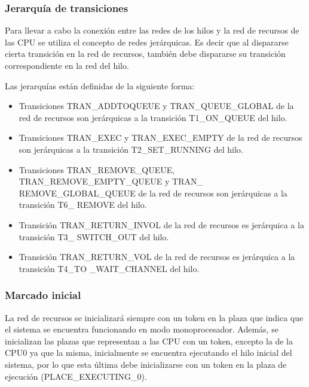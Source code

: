 \subsubsection{Jerarquía de transiciones}
Para llevar a cabo la conexión entre las redes de los hilos y la red de recursos de las CPU se utiliza el concepto de redes jerárquicas. Es decir que al dispararse cierta transición en la red de recursos, también debe dispararse su transición correspondiente en la red del hilo.

Las jerarquías están definidas de la siguiente forma:
\begin{itemize}
    \item Transiciones TRAN\_ADDTOQUEUE y TRAN\_QUEUE\_GLOBAL de la red de recursos son jerárquicas a la transición T1\_ON\_QUEUE del hilo.
    \item Transiciones TRAN\_EXEC y TRAN\_EXEC\_EMPTY de la red de recursos son jerárquicas a la transición T2\_SET\_RUNNING del hilo.
    \item Transiciones TRAN\_REMOVE\_QUEUE, TRAN\_REMOVE\_EMPTY\_QUEUE y TRAN\_ REMOVE\_GLOBAL\_QUEUE de la red de recursos son jerárquicas a la transición T6\_ REMOVE del hilo.
    \item Transición TRAN\_RETURN\_INVOL de la red de recursos es jerárquica a la transición T3\_ SWITCH\_OUT del hilo.
    \item Transición TRAN\_RETURN\_VOL de la red de recursos es jerárquica a la transición T4\_TO \_WAIT\_CHANNEL del hilo.
\end{itemize}

\subsubsection{Marcado inicial}
La red de recursos se inicializará siempre con un token en la plaza que indica que el sistema se encuentra funcionando en modo monoprocesador. Además, se inicializan las plazas que representan a las CPU con un token, excepto la de la CPU0 ya que la misma, inicialmente se encuentra ejecutando el hilo inicial del sistema, por lo que esta última debe inicializarse con un token en la plaza de ejecución (PLACE\_EXECUTING\_0).

